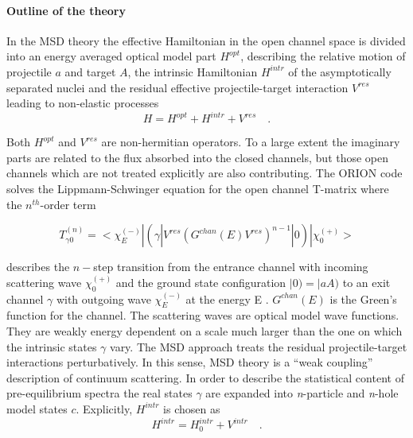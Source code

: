 \paragraph{\label{sec: MSD}Outline of the theory}

In the MSD%
 theory the effective Hamiltonian in the open channel space is
divided into an energy averaged optical model part $H^{opt}$, describing the
relative motion of projectile $a$ and target $A$, the intrinsic Hamiltonian $%
H^{intr}$ of the asymptotically separated nuclei and the residual effective
projectile-target interaction $V^{res}$ leading to non-elastic processes
\begin{equation}
H=H^{opt}+H^{intr}+V^{res}\quad.  \label{fullh}
\end{equation}

\noindent Both $H^{opt}$ and $V^{res}$ are non-hermitian operators. To a
large extent the imaginary parts are related to the flux absorbed into the
closed channels, but those open channels which are not treated explicitly
are also contributing. The ORION code solves the Lippmann-Schwinger equation
for the open channel T-matrix where the $n^{th}$-order term

\begin{equation}
T_{\gamma0}^{(n)}=<\chi_{E}^{(-)}|(%
\gamma|V^{res}(G^{chan}(E)V^{res})^{n-1}|0)|\chi_{0}^{(+)}>  \label{tgamman}
\end{equation}

\noindent describes the $n-$step transition from the entrance channel with
incoming scattering wave $\chi_{0}^{(+)}$ and the ground state configuration
$|0)=|aA)$ to an exit channel $\gamma$ with outgoing wave $\chi_{E}^{(-)}$
at the energy E \cite{SLW,LW92}. $G^{chan}(E)$ is the Green's function for
the channel. The scattering waves are optical model wave functions. They are
weakly energy dependent on a scale much larger than the one on which the
intrinsic states $\gamma$ vary. The MSD approach treats the residual
projectile-target interactions perturbatively. In this sense, MSD theory is
a {}``weak coupling'' description of continuum scattering. In order to
describe the statistical content of pre-equilibrium spectra the real states $%
\gamma$ are expanded into \emph{n}-particle and \emph{n}-hole model states $c
$. Explicitly, $H^{intr}$ is chosen as
\begin{equation}
H^{intr}=H_{0}^{intr}+V^{intr}\quad.  \label{hintr}
\end{equation}

